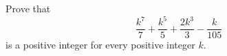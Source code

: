 Prove that
\[
\dfrac{k^7}{7}+\dfrac{k^5}{5}+\dfrac{2k^3}{3}-\dfrac{k}{105}
\]
is a positive integer for every positive integer $k$.
